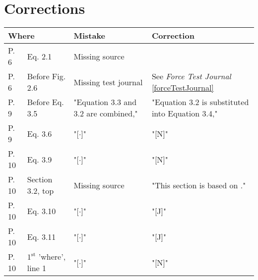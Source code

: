 \section*{Corrections}
\begin{table}[H]
  \begin{tabular}{|lp{4cm}|p{8cm}|p{12cm}|}
    \hline %
    \multicolumn{2}{|l|}{\textbf{Where}} & \textbf{Mistake} & \textbf{Correction} \\
    \hline %
    P. 6  & Eq. 2.1             &  Missing source  &    \cite{JHHorgensen}    \\
    \hline %
    P. 6  & Before Fig. 2.6     &  Missing test journal & See \textit{Force Test Journal} \autoref{forceTestJournal} \\
    \hline %
    P. 9  & Before Eq. 3.5      &  "Equation 3.3 and 3.2 are combined,"    & "Equation 3.2 is substituted into Equation 3.4,"  \\
    \hline %
    P. 9  & Eq. 3.6             &  "[$\cdot$]"     & "[\si{N}]"          \\
    \hline %
    P. 10 & Eq. 3.9            &  "[$\cdot$]"     & "[\si{N}]"          \\
    \hline %
    P. 10 & Section 3.2, top   & Missing source   &  "This section is based on \cite{RWisniewski}."  \\
    \hline %
    P. 10 & Eq. 3.10           &  "[$\cdot$]"     & "[\si{J}]"          \\
    \hline %
    P. 10 & Eq. 3.11           &  "[$\cdot$]"     & "[\si{J}]"          \\
    \hline %
    P. 10 & $1^\mathrm{st}$ 'where', line 1  & "[$\cdot$]" &  "[\si{N}]"  \\
    \hline %

\end{tabular}
\end{table}
